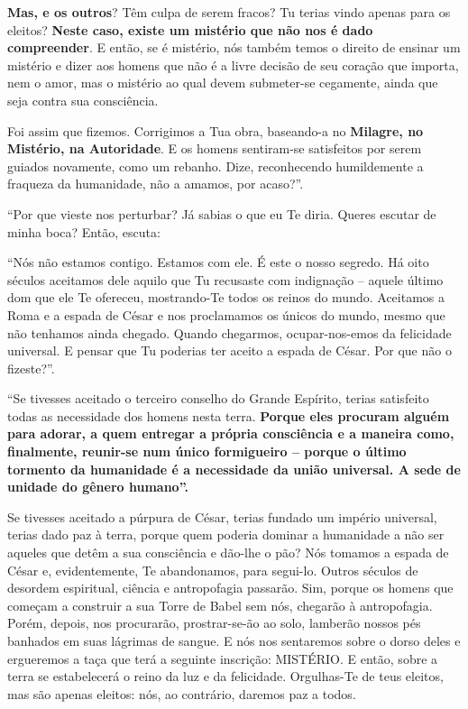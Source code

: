 \textbf{Mas, e os outros}? Têm culpa de serem fracos? Tu terias vindo
apenas para os eleitos? \textbf{Neste caso, existe um mistério que não
nos é dado compreender}. E então, se é mistério, nós também temos o
direito de ensinar um mistério e dizer aos homens que não é a livre
decisão de seu coração que importa, nem o amor, mas o mistério ao qual
devem submeter-se cegamente, ainda que seja contra sua consciência.

Foi assim que fizemos. Corrigimos a Tua obra, baseando-a no
\textbf{Milagre, no} \textbf{Mistério, na Autoridade}. E os homens
sentiram-se satisfeitos por serem guiados novamente, como um rebanho.
Dize, reconhecendo humildemente a fraqueza da humanidade, não a amamos,
por acaso?''.

``Por que vieste nos perturbar? Já sabias o que eu Te diria. Queres
escutar de minha boca? Então, escuta:

``Nós não estamos contigo. Estamos com ele. É este o nosso segredo. Há
oito séculos aceitamos dele aquilo que Tu recusaste com indignação --
aquele último dom que ele Te ofereceu, mostrando-Te todos os reinos do
mundo. Aceitamos a Roma e a espada de César e nos proclamamos os únicos
do mundo, mesmo que não tenhamos ainda chegado. Quando chegarmos,
ocupar-nos-emos da felicidade universal. E pensar que Tu poderias ter
aceito a espada de César. Por que não o fizeste?''.

``Se tivesses aceitado o terceiro conselho do Grande Espírito, terias
satisfeito todas as necessidade dos homens nesta terra. \textbf{Porque
eles procuram alguém para adorar, a quem entregar a própria consciência
e a maneira como, finalmente, reunir-se num único formigueiro -- porque
o último tormento da humanidade é a necessidade da união universal. A
sede de unidade do gênero humano''.}

Se tivesses aceitado a púrpura de César, terias fundado um império
universal, terias dado paz à terra, porque quem poderia dominar a
humanidade a não ser aqueles que detêm a sua consciência e dão-lhe o
pão? Nós tomamos a espada de César e, evidentemente, Te abandonamos,
para segui-lo. Outros séculos de desordem espiritual, ciência e
antropofagia passarão. Sim, porque os homens que começam a construir a
sua Torre de Babel sem nós, chegarão à antropofagia. Porém, depois, nos
procurarão, prostrar-se-ão ao solo, lamberão nossos pés banhados em suas
lágrimas de sangue. E nós nos sentaremos sobre o dorso deles e
ergueremos a taça que terá a seguinte inscrição: MISTÉRIO. E então,
sobre a terra se estabelecerá o reino da luz e da felicidade.
Orgulhas-Te de teus eleitos, mas são apenas eleitos: nós, ao contrário,
daremos paz a todos.

